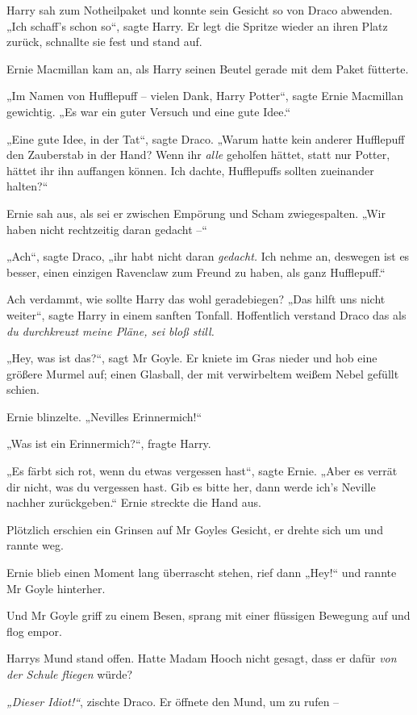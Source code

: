 {Harry sah zum Notheilpaket und konnte sein Gesicht so von Draco abwenden. „Ich schaff's schon so“, sagte Harry. Er legt die Spritze wieder an ihren Platz zurück, schnallte sie fest und stand auf.

Ernie Macmillan kam an, als Harry seinen Beutel gerade mit dem Paket fütterte.

„Im Namen von Hufflepuff -- vielen Dank, Harry Potter“, sagte Ernie Macmillan gewichtig. „Es war ein guter Versuch und eine gute Idee.“

„Eine gute Idee, in der Tat“, sagte Draco. „Warum hatte kein anderer Hufflepuff den Zauberstab in der Hand? Wenn ihr \emph{alle} geholfen hättet, statt nur Potter, hättet ihr ihn auffangen können. Ich dachte, Hufflepuffs sollten zueinander halten?“

Ernie sah aus, als sei er zwischen Empörung und Scham zwiegespalten. „Wir haben nicht rechtzeitig daran gedacht --“

„Ach“, sagte Draco, „ihr habt nicht daran \emph{gedacht.} Ich nehme an, deswegen ist es besser, einen einzigen Ravenclaw zum Freund zu haben, als ganz Hufflepuff.“

Ach verdammt, wie sollte Harry das wohl geradebiegen? „Das hilft uns nicht weiter“, sagte Harry in einem sanften Tonfall. Hoffentlich verstand Draco das als \emph{du durchkreuzt meine Pläne, sei bloß still.}

„Hey, was ist das?“, sagt Mr Goyle. Er kniete im Gras nieder und hob eine größere Murmel auf; einen Glasball, der mit verwirbeltem weißem Nebel gefüllt schien.

Ernie blinzelte. „Nevilles Erinnermich!“

„Was ist ein Erinnermich?“, fragte Harry.

„Es färbt sich rot, wenn du etwas vergessen hast“, sagte Ernie. „Aber es verrät dir nicht, was du vergessen hast. Gib es bitte her, dann werde ich's Neville nachher zurückgeben.“ Ernie streckte die Hand aus.

Plötzlich erschien ein Grinsen auf Mr Goyles Gesicht, er drehte sich um und rannte weg.

Ernie blieb einen Moment lang überrascht stehen, rief dann „Hey!“ und rannte Mr Goyle hinterher.

Und Mr Goyle griff zu einem Besen, sprang mit einer flüssigen Bewegung auf und flog empor.

Harrys Mund stand offen. Hatte Madam Hooch nicht gesagt, dass er dafür \emph{von der Schule fliegen} würde?

\emph{„Dieser Idiot!“}, zischte Draco. Er öffnete den Mund, um zu rufen --

}
